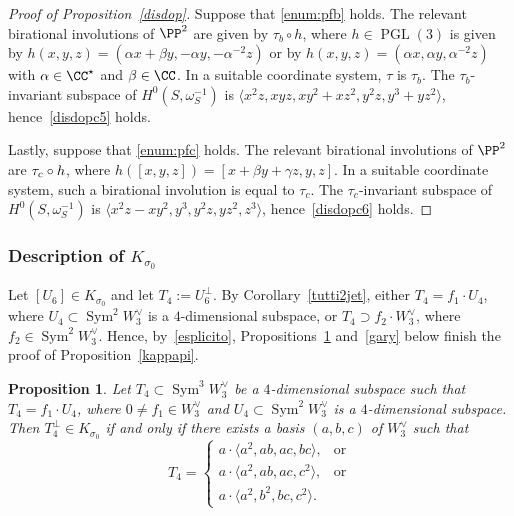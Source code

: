 \documentclass[JEP,XML,SOM,Unicode, NoEqCountersInSection,NoFloatCountersInSection]{cedram}
\newtheorem{prop}[lemm]{Proposition}
\theoremstyle{definition}
\let\la\langle
\let\ra\rangle
\DeclareMathOperator{\PGL}{PGL}
\DeclareMathOperator{\Sym}{Sym}
\begin{document}
\begin{proof}[Proof of Proposition~\ref{disdop}]
Suppose that \eqref{enum:pfb} holds. The relevant birational involutions of $\PP^2$ are given by $\tau_b\circ h$, where
$h\in\PGL(3)$ is given by $h(x,y,z)=(\alpha x+\beta y,-\alpha y,-\alpha^{-2} z)$ or by $h(x,y,z)=(\alpha x,\alpha y,\alpha^{-2} z)$ with $\alpha\in\CC^\star$ and $\beta\in\CC$. In a suitable coordinate system, $\tau$ is $\tau_b$.
The $\tau_b$-invariant subspace of $H^0({ S},\omega^{-1}_{{ S}})$ is $\la x^2z, xyz, xy^2+xz^2,y^2z, y^3+yz^2 \ra$, hence~\eqref{disdopc5} holds.

Lastly, suppose that \eqref{enum:pfc} holds. The relevant birational involutions of $\PP^2$ are $\tau_c\circ\nobreak h$, where
$h([x,y,z])=[x+\beta y+\gamma z,y, z]$. In a suitable coordinate system, such a birational involution is equal to $\tau_c$. The $\tau_c$-invariant subspace of $H^0({ S},\omega^{-1}_{{ S}})$ is \hbox{$\la x^2z-xy^2, y^3, y^2z, yz^2, z^3 \ra$}, hence~\eqref{disdopc6} holds.
\end{proof}

\subsubsection{Description of $K_{\sigma_0}$}\label{dimokappa}

Let $[U_6]\in K_{\sigma_0}$ and let $T_4:=U_6^{\bot}$. By Corollary~\ref{tutti2jet}, either $T_4=f_1\cdot U_4$, where $U_4\subset\Sym^2\! W_3^{\vee}$ is a $4$-dimensional subspace, or $T_4\supset f_2\cdot W_3^{\vee}$, where
$f_2\in \Sym^2 \!W_3^{\vee}$. Hence, by~\eqref{esplicito}, Propositions~\ref{romain} and~\ref{gary} below finish the proof of Proposition~\ref{kappapi}.

\begin{prop}\label{romain}
Let $T_4\subset \Sym^3 \!W^{\vee}_3$ be a $4$-dimensional subspace such that
$T_4=f_1\cdot U_4$, where $0\ne f_1\in W_3^{\vee}$ and $U_4\subset\Sym^2\! W_3^{\vee}$ is a $4$-dimensional subspace.
Then $T_4^{\bot}\in K_{\sigma_0}$ if and only if there exists a basis $(a,b,c)$ of $W^{\vee}_3$ such that
\[
T_4=
\begin{cases}
a\cdot\la a^2, ab,ac,bc\ra,& \text{or}\\
a\cdot\la a^2,ab,ac,c^2\ra, &\text{or}\\
a\cdot\la a^2,b^2,bc,c^2\ra.
\end{cases}
\]
\end{prop}
\end{document}
